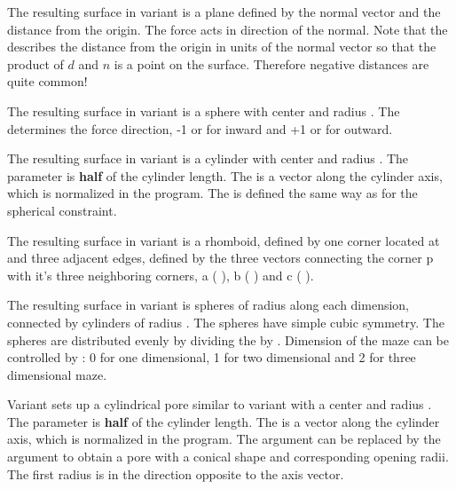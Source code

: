 The resulting surface in variant  is a plane defined by the
normal vector    and the distance
 from the origin. The force acts in direction of the normal. 
Note that the  describes the distance from the origin in units
of the normal vector so that the product of $d$ and $n$ is a point on the
surface. Therefore negative distances are quite common!

The resulting surface in variant
 is a sphere with center    and radius
. The  determines the force direction, -1 or
 for inward and +1 or  for outward. 

The resulting surface
in variant  is a cylinder with center  
 and radius . The  parameter is \textbf{half} 
of the cylinder length. The  is a
vector along the cylinder axis, which is normalized in the program.
The  is defined the same way as for the spherical
constraint. 

The resulting surface in variant  is a rhomboid, defined by one 
corner located at    and three adjacent edges, 
defined by the three vectors connecting the corner p with it's three neighboring
corners, a (  ), b (  ) 
and c (  ).

The resulting surface in variant  is 
spheres of radius  along each dimension, connected by
cylinders of radius . The spheres have simple cubic
symmetry. The spheres are distributed evenly by dividing the
 by .  Dimension of the maze can be controlled by
: 0 for one dimensional, 1 for two dimensional and 2 for three
dimensional maze.

Variant  sets up a cylindrical pore similar to variant
 with a center    and radius
. The  parameter is \textbf{half} of the cylinder
length. The  is a vector along the cylinder axis, which is
normalized in the program. The argument  
can be replaced by the argument 
to obtain a pore with a conical shape and corresponding opening radii.
The first radius is in the direction opposite to the axis vector.

